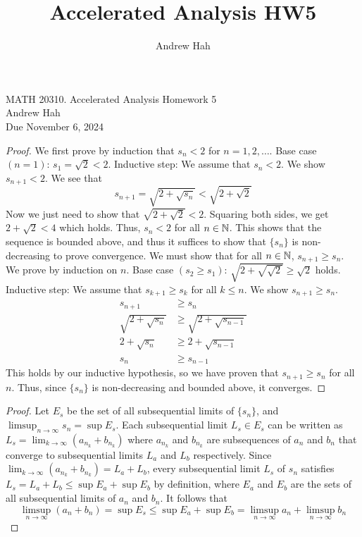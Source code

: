 \documentclass[11pt]{article}
\title{Accelerated Analysis HW5}
\author{Andrew Hah}
\begin{document}
\pagestyle{plain}
\begin{center}
{\Large MATH 20310. Accelerated Analysis Homework 5} \\ 
\vspace{.2in}  
Andrew Hah \\
Due November 6, 2024
\end{center}

\begin{exercise}{3}
    \begin{proof}
        We first prove by induction that $s_n < 2$ for $n = 1, 2, \dots$. Base case $(n = 1)$: $s_1 = \sqrt{2} < 2$. Inductive step: We assume that $s_n < 2$. We show $s_{n+1} < 2$. We see that $$s_{n+1} = \sqrt{2 + \sqrt{s_n}} < \sqrt{2 +\sqrt{2}}$$ Now we just need to show that $\sqrt{2 + \sqrt{2}} < 2$. Squaring both sides, we get $2 + \sqrt{2} < 4$ which holds. Thus, $s_n < 2$ for all $n \in \mathbb{N}$. This shows that the sequence is bounded above, and thus it suffices to show that $\{ s_n \}$ is non-decreasing to prove convergence. We must show that for all $n \in \mathbb{N}$, $s_{n + 1} \ge s_n$. We prove by induction on $n$. Base case $(s_2 \ge s_1)$: $\sqrt{2 + \sqrt{\sqrt{2}}} \ge \sqrt{2}$ holds. Inductive step: We assume that $s_{k+1} \ge s_{k}$ for all $k \le n$. We show $s_{n+1} \ge s_n$. \begin{equation*}
            \begin{split}
                s_{n+1} & \ge s_n \\
                \sqrt{2 + \sqrt{s_n}} & \ge \sqrt{2 + \sqrt{s_{n-1}}} \\
                2 + \sqrt{s_n} & \ge 2 + \sqrt{s_{n - 1}} \\
                s_n & \ge s_{n-1}
            \end{split}
        \end{equation*}
        This holds by our inductive hypothesis, so we have proven that $s_{n+1} \ge s_n$ for all $n$. Thus, since $\{ s_n \}$ is non-decreasing and bounded above, it converges. 
    \end{proof}
\end{exercise}

\begin{exercise}{5}
    \begin{proof}
        Let $E_s$ be the set of all subsequential limits of $\{ s_n \}$, and $\limsup_{n \to \infty} s_n = \sup E_s$. Each subsequential limit $L_s \in E_s$ can be written as $L_s = \lim_{k \to \infty} (a_{n_k} + b_{n_k})$ where $a_{n_k}$ and $b_{n_k}$ are subsequences of $a_n$ and $b_n$ that converge to subsequential limits $L_a$ and $L_b$ respectively. Since $\lim_{k \to \infty} (a_{n_k} + b_{n_k}) = L_a + L_b$, every subsequential limit $L_s$ of $s_n$ satisfies $L_s = L_a + L_b \le \sup E_a + \sup E_b$ by definition, where $E_a$ and $E_b$ are the sets of all subsequential limits of $a_n$ and $b_n$. It follows that $$\limsup_{n \to \infty} (a_n + b_n) = \sup E_s \le \sup E_a + \sup E_b = \limsup_{n \to \infty} a_n + \limsup_{n \to \infty} b_n$$
    \end{proof}
\end{exercise}
\end{document}
